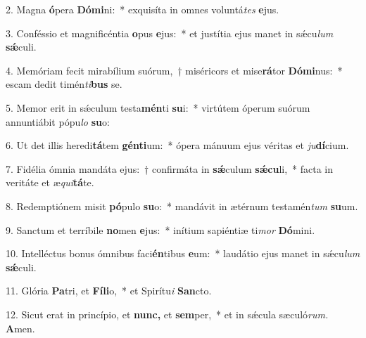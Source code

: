 \item 2. Magna \textbf{ó}pera \textbf{Dó}\textbf{mi}ni:~* exquisíta in omnes voluntá\hspace{0.03em}\textit{tes} \textbf{e}jus.
\item 3. Conféssio et magnificéntia \textbf{o}pus \textbf{e}jus:~* et justítia ejus manet in sǽcu\hspace{0.03em}\textit{lum} \textbf{sǽ}culi.
\item 4. Memóriam fecit mirabílium suórum,~† miséricors et mise\textbf{rá}tor \textbf{Dó}\textbf{mi}nus:~* escam dedit timén\hspace{0.03em}\textit{ti}\textbf{bus} se.
\item 5. Memor erit in sǽculum testa\textbf{mén}ti \textbf{su}i:~* virtútem óperum suórum annuntiábit pópu\hspace{0.03em}\textit{lo} \textbf{su}o:
\item 6. Ut det illis heredi\textbf{tá}tem \textbf{gén}\textbf{ti}um:~* ópera mánuum ejus véritas et \textit{ju}\textbf{dí}cium.
\item 7. Fidélia ómnia mandáta ejus:~† confirmáta in \textbf{sǽ}culum \textbf{sǽ}\textbf{cu}li,~* facta in veritáte et æ\hspace{0.03em}\textit{qui}\textbf{tá}te.
\item 8. Redemptiónem misit \textbf{pó}pulo \textbf{su}o:~* mandávit in ætérnum testamén\hspace{0.03em}\textit{tum} \textbf{su}um.
\item 9. Sanctum et terríbile \textbf{no}men \textbf{e}jus:~* inítium sapiéntiæ ti\hspace{0.03em}\textit{mor} \textbf{Dó}mini.
\item 10. Intelléctus bonus ómnibus faci\textbf{én}tibus \textbf{e}um:~* laudátio ejus manet in sǽcu\hspace{0.03em}\textit{lum} \textbf{sǽ}culi.
\item 11. Glória \textbf{Pa}tri, et \textbf{Fí}\textbf{li}o,~* et Spirítu\hspace{0.03em}\textit{i} \textbf{San}cto.
\item 12. Sicut erat in princípio, et \textbf{nunc,} et \textbf{sem}per,~* et in sǽcula sæculó\textit{rum.} \textbf{A}men.
